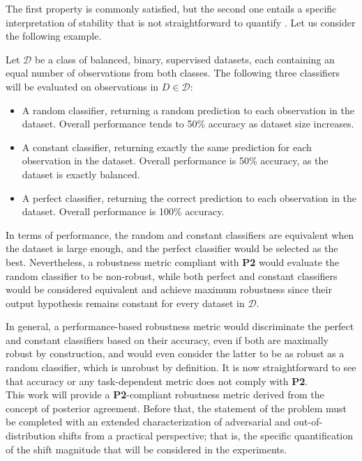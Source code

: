 The first property is commonly satisfied, but the second one entails
a specific interpretation of stability that is not straightforward to
quantify \cite{buhmannPosteriorAgreementModel2022}. Let us consider
the following example.

\begin{example}\label{example:robustness}
    Let $\mathcal{D}$ be a class of balanced, binary, supervised datasets, each containing an equal 
    number of observations from both classes. The following three classifiers will be evaluated
    on observations in $D \in \mathcal{D}$:

    \begin{itemize}
        \item A random classifier, returning
        a random prediction to each observation in the dataset. Overall performance 
        tends to 50\% accuracy as dataset size increases. 
        \item A constant classifier, returning exactly the same
        prediction for each observation in the dataset. Overall performance is 50\% accuracy,
        as the dataset is exactly balanced.
        \item A perfect classifier, returning the correct prediction
        to each observation in the dataset. Overall performance is 100\% accuracy. 
    \end{itemize}

    In terms of performance, the random and constant classifiers are equivalent when
    the dataset is large enough, and the perfect classifier would be selected as the best.
    Nevertheless, a robustness metric compliant with \textbf{P2} would
    evaluate the random classifier to be non-robust, while both perfect and
    constant classifiers would be considered equivalent and achieve
    maximum robustness since their output hypothesis remains constant for 
    every dataset in $\mathcal{D}$.
\end{example}

In general, a performance-based robustness metric would discriminate the perfect and
constant classifiers based on their accuracy, even if both are maximally robust
by construction, and would even consider the latter to be as robust as 
a random classifier, which is unrobust by definition. It is now straightforward to see 
that accuracy or any task-dependent metric does not comply with \textbf{P2}. \\

This work will provide a \textbf{P2}-compliant robustness metric derived from the
concept of posterior agreement. Before that, the statement of the problem must be 
completed with an extended characterization of adversarial and out-of-distribution 
shifts from a practical perspective; that is, the specific quantification
of the shift magnitude that will be considered in the experiments.

